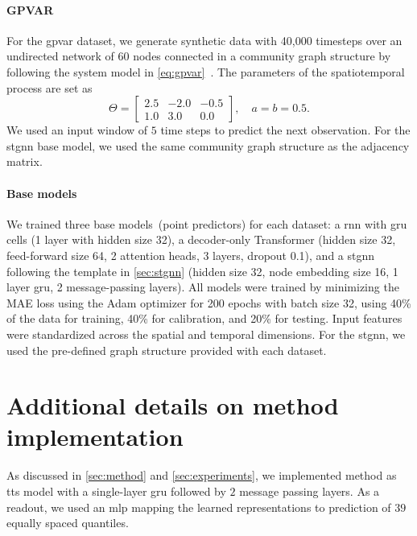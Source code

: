 \paragraph{GPVAR} For the \gls{gpvar} dataset, we generate synthetic data with 40,000 timesteps over an undirected network of 60 nodes connected in a community graph structure by following the system model in \autoref{eq:gpvar}~\cite{zambon2022aztest}. The parameters of the spatiotemporal process are set as
\begin{equation}
    \Theta = \begin{bmatrix} 2.5 & -2.0 & -0.5 \\ 1.0 & 3.0 & 0.0 \end{bmatrix}, \quad a=b=0.5.
\end{equation}
We used an input window of $5$ time steps to predict the next observation. For the \gls{stgnn} base model, we used the same community graph structure as the adjacency matrix.

\paragraph{Base models} We trained three base models~(point predictors) for each dataset: a \gls{rnn} with \gls{gru} cells (1 layer with hidden size 32), a decoder-only Transformer (hidden size 32, feed-forward size 64, 2 attention heads, 3 layers, dropout 0.1), and a \gls{stgnn} following the template in \autoref{sec:stgnn} (hidden size 32, node embedding size 16, 1 layer \gls{gru}, 2 message-passing layers). All models were trained by minimizing the MAE loss using the Adam optimizer for 200 epochs with batch size 32, using 40\% of the data for training, 40\% for calibration, and 20\% for testing. Input features were standardized across the spatial and temporal dimensions. For the \gls{stgnn}, we used the pre-defined graph structure provided with each dataset.

\section{Additional details on \gls{method} implementation}\label{a:corel}

As discussed in \autoref{sec:method} and \autoref{sec:experiments}, we implemented \gls{method} as 
\gls{tts} model with a single-layer \gls{gru} followed by $2$ message passing layers. As a readout, we used an \gls{mlp} mapping the learned representations to prediction of $39$ equally spaced quantiles. 

